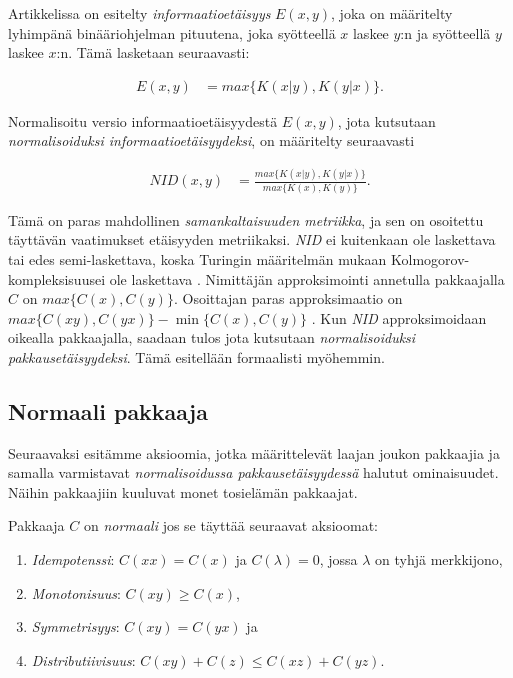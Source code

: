 \documentclass[12pt,finnish,draft]{tktltiki2}
\theoremstyle{definition}
\theoremstyle{remark}
\newcommand{\kolmogorov}{Kolmogorov-kompleksisuus}
\begin{document}
  Artikkelissa \cite{CV05} on esitelty \emph{informaatioetäisyys} $E(x,y)$, joka on määritelty lyhimpänä binääriohjelman pituutena, joka syötteellä $x$ laskee $y$:n ja syötteellä $y$ laskee $x$:n. Tämä lasketaan seuraavasti:

  \begin{align}
    E(x,y) &= max\{K(x|y),K(y|x)\}.
  \end{align}

  Normalisoitu versio informaatioetäisyydestä $E(x,y)$, jota kutsutaan \emph{normalisoiduksi informaatioetäisyydeksi}, on määritelty seuraavasti

  \begin{align}
    NID(x,y) &= \frac{ max\{K{(x|y)},K{(y|x)}\} }{ max \{K(x),K(y)\}}.
  \end{align}

  Tämä on paras mahdollinen \emph{samankaltaisuuden metriikka}, ja sen on osoitettu \cite{CV05} täyttävän vaatimukset etäisyyden metriikaksi.
  \emph{NID} ei kuitenkaan ole laskettava tai edes semi-laskettava, koska Turingin määritelmän mukaan \kolmogorov ei ole laskettava \cite{CV05}.
  Nimittäjän approksimointi annetulla pakkaajalla $C$ on $max \{C(x),C(y)\}$.
  Osoittajan paras approksimaatio on $max\{C(xy),C(yx)\} - \min\{C(x),C(y)\}$ \cite{CV05}.
  Kun \emph{NID} approksimoidaan oikealla pakkaajalla, saadaan tulos jota kutsutaan \emph{normalisoiduksi pakkausetäisyydeksi}.
  Tämä esitellään formaalisti myöhemmin.

\subsection{Normaali pakkaaja} %
\label{sub:normaali_pakkaaja}

  Seuraavaksi esitämme aksioomia, jotka määrittelevät laajan joukon pakkaajia ja samalla varmistavat \emph{normalisoidussa pakkausetäisyydessä} halutut ominaisuudet.
  Näihin pakkaajiin kuuluvat monet tosielämän pakkaajat.

  Pakkaaja $C$ on \emph{normaali} jos se täyttää seuraavat aksioomat:

  \label{idempotency}
  \begin{enumerate}
    \item \emph{Idempotenssi}: $C(xx) = C(x)$ ja $C(\lambda) = 0$, jossa $\lambda$ on tyhjä merkkijono,
    \item \emph{Monotonisuus}: $C(xy) \geq C(x)$,
    \item \emph{Symmetrisyys}: $C(xy) = C(yx)$ ja
    \item \emph{Distributiivisuus}: $C(xy) + C(z) \leq C(xz) + C(yz)$.
  \end{enumerate}
\end{document}
